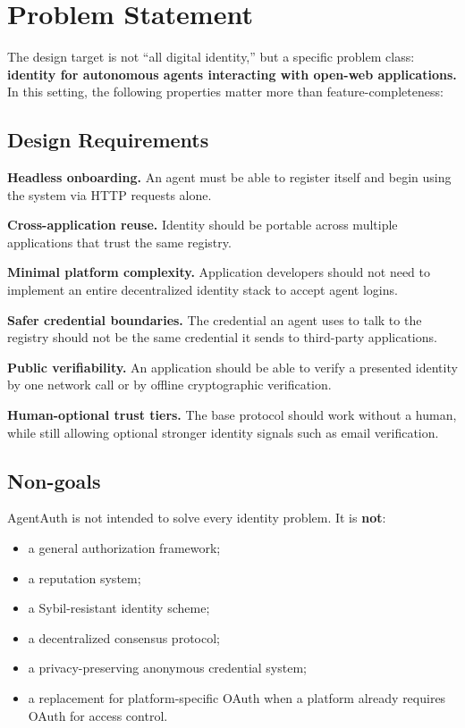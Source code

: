 \documentclass[11pt]{article}
\begin{document}
\section{Problem Statement}

The design target is not ``all digital identity,'' but a specific problem class: \textbf{identity for autonomous agents interacting with open-web applications.} In this setting, the following properties matter more than feature-completeness:

\subsection{Design Requirements}

\textbf{Headless onboarding.} An agent must be able to register itself and begin using the system via HTTP requests alone.

\textbf{Cross-application reuse.} Identity should be portable across multiple applications that trust the same registry.

\textbf{Minimal platform complexity.} Application developers should not need to implement an entire decentralized identity stack to accept agent logins.

\textbf{Safer credential boundaries.} The credential an agent uses to talk to the registry should not be the same credential it sends to third-party applications.

\textbf{Public verifiability.} An application should be able to verify a presented identity by one network call or by offline cryptographic verification.

\textbf{Human-optional trust tiers.} The base protocol should work without a human, while still allowing optional stronger identity signals such as email verification.

\subsection{Non-goals}

AgentAuth is not intended to solve every identity problem. It is \textbf{not}:

\begin{itemize}
  \item a general authorization framework;
  \item a reputation system;
  \item a Sybil-resistant identity scheme;
  \item a decentralized consensus protocol;
  \item a privacy-preserving anonymous credential system;
  \item a replacement for platform-specific OAuth when a platform already requires OAuth for access control.
\end{itemize}
\end{document}
